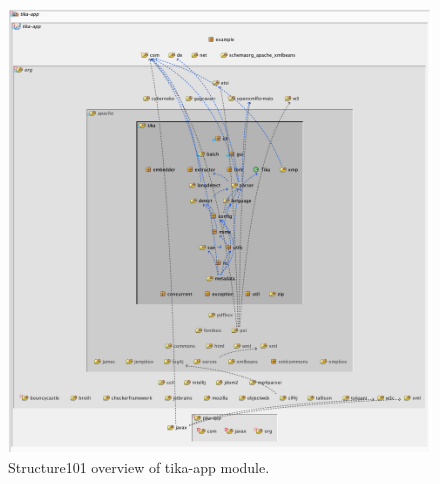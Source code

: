\documentclass{article}
\begin{document}
\begin{figure}
    \centering
    \includegraphics[width=\textwidth]{report/images/tika_app/tika_app-s101-overview.png}
    \caption{Structure101 overview of tika-app module.}
    \label{fig:tika_app/s101-overview}
\end{figure}
\end{document}
